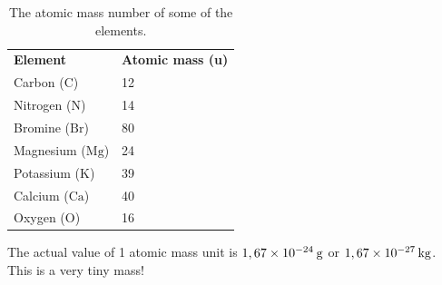  
          \begin{table}[H]
        \begin{center}
      \label{m38756*uid8}
    \noindent
      \tablelasttail{}
      \begin{xtabular}[t]{|l|l|}\hline
                  \textbf{Element}
                 &
                  \textbf{Atomic mass (u)}
     \tabularnewline{}
        Carbon ($\mathrm{C}$) &
        12%
     \tabularnewline{}
        Nitrogen ($\mathrm{N}$) &
        14%
     \tabularnewline{}
        Bromine ($\mathrm{Br}$) &
        80%
     \tabularnewline{}
        Magnesium ($\mathrm{Mg}$) &
        24%
     \tabularnewline{}
        Potassium ($\mathrm{K}$) &
        39%
     \tabularnewline{}
        Calcium ($\mathrm{Ca}$) &
        40%
     \tabularnewline{}
        Oxygen ($\mathrm{O}$) &
        16%
     \tabularnewline{}
    \end{xtabular}
      \end{center}
    \caption{The atomic mass number of some of the elements.}
\label{tab:atomic mass}
\end{table}
    \par
        \label{m38756*id255096}The actual value of 1 atomic mass unit is $1,67\ensuremath{\times}{10}^{-24}\phantom{\rule{2pt}{0ex}}\mathrm{g}$ or $1,67\ensuremath{\times}{10}^{-27}\phantom{\rule{2pt}{0ex}}\mathrm{kg}$. This is a very tiny mass!\par 
      \label{m38756*uid9}
